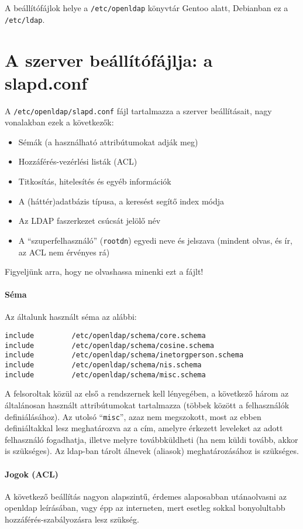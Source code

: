 A beállítófájlok helye a \texttt{/etc/openldap} könyvtár Gentoo alatt, Debianban ez a \texttt{/etc/ldap}.

\section{A szerver beállítófájlja: a slapd.conf}
A \texttt{/etc/openldap/slapd.conf} fájl tartalmazza a szerver beállításait, nagy vonalakban ezek a következők:

\begin{itemize}
\item Sémák (a használható attribútumokat adják meg)
\item Hozzáférés-vezérlési listák (ACL)
\item Titkosítás, hitelesítés és egyéb információk
\item A (háttér)adatbázis típusa, a keresést segítő index módja
\item Az LDAP faszerkezet csúcsát jelölő név
\item A ``szuperfelhasználó'' (\texttt{rootdn}) egyedi neve és jelszava (mindent olvas, és ír, az ACL nem érvényes rá)
\end{itemize}  

Figyeljünk arra, hogy ne olvashassa minenki ezt a fájlt!

\paragraph{Séma} Az általunk használt séma az alábbi:

\begin{Verbatim}[frame=single]
include         /etc/openldap/schema/core.schema
include         /etc/openldap/schema/cosine.schema
include         /etc/openldap/schema/inetorgperson.schema
include         /etc/openldap/schema/nis.schema
include         /etc/openldap/schema/misc.schema
\end{Verbatim}
  
A felsoroltak közül az első a rendszernek kell lényegében, a következő három az általánosan használt attribútumokat tartalmazza
(többek között a felhasználók definiálásához). Az utolsó ``\texttt{misc}'', azaz nem megszokott, most az ebben
definiáltakkal lesz meghatározva az a cím, amelyre érkezett leveleket az adott felhasználó fogadhatja, illetve melyre
továbbküldheti (ha nem küldi tovább, akkor is szükséges). Az ldap-ban tárolt álnevek (aliasok) meghatározásához is
szükséges.

\paragraph{Jogok (ACL)} A következő beállítás nagyon alapszintű, érdemes alaposabban utánaolvasni az openldap
leírásában, vagy épp az interneten, mert esetleg sokkal bonyolultabb hozzáférés-szabályozásra lesz szükség.

